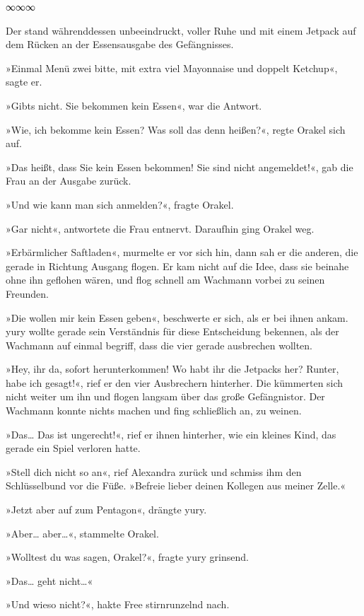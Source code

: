 \begin{center}
    ∞∞∞
\end{center}

Der stand währenddessen unbeeindruckt, voller Ruhe und mit einem Jetpack auf dem Rücken an der Essensausgabe des Gefängnisses.

»Einmal Menü zwei bitte, mit extra viel Mayonnaise und doppelt Ketchup«, sagte er.

»Gibts nicht. Sie bekommen kein Essen«, war die Antwort.

»Wie, ich bekomme kein Essen? Was soll das denn heißen?«, regte Orakel sich auf.

»Das heißt, dass Sie kein Essen bekommen! Sie sind nicht angemeldet!«, gab die Frau an der Ausgabe zurück.

»Und wie kann man sich anmelden?«, fragte Orakel.

»Gar nicht«, antwortete die Frau entnervt. Daraufhin ging Orakel weg.

»Erbärmlicher Saftladen«, murmelte er vor sich hin, dann sah er die anderen, die gerade in Richtung Ausgang flogen. Er kam nicht auf die Idee, dass sie beinahe ohne ihn geflohen wären, und flog schnell am Wachmann vorbei zu seinen Freunden.

»Die wollen mir kein Essen geben«, beschwerte er sich, als er bei ihnen ankam. yury wollte gerade sein Verständnis für diese Entscheidung bekennen, als der Wachmann auf einmal begriff, dass die vier gerade ausbrechen wollten.

»Hey, ihr da, sofort herunterkommen! Wo habt ihr die Jetpacks her? Runter, habe ich gesagt!«, rief er den vier Ausbrechern hinterher. Die kümmerten sich nicht weiter um ihn und flogen langsam über das große Gefängnistor. Der Wachmann konnte nichts machen und fing schließlich an, zu weinen.

»Das… Das ist ungerecht!«, rief er ihnen hinterher, wie ein kleines Kind, das gerade ein Spiel verloren hatte.

»Stell dich nicht so an«, rief Alexandra zurück und schmiss ihm den Schlüsselbund vor die Füße. »Befreie lieber deinen Kollegen aus meiner Zelle.«

»Jetzt aber auf zum Pentagon«, drängte yury.

»Aber… aber…«, stammelte Orakel.

»Wolltest du was sagen, Orakel?«, fragte yury grinsend.

»Das… geht nicht…«

»Und wieso nicht?«, hakte Free stirnrunzelnd nach.

